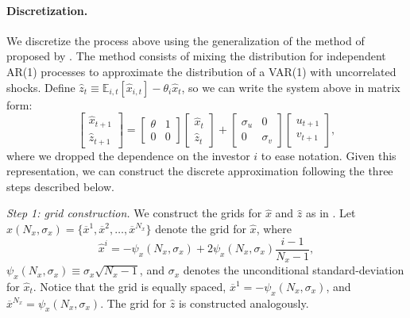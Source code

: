 \paragraph{Discretization.} We discretize the process above using the generalization of the method of \citet{rouwenhurst1995asset} proposed by \citet{gospodinov2014moment}. 
The method consists of mixing the distribution for independent AR(1) processes to approximate the distribution of a VAR(1) with uncorrelated shocks. 
Define $\hat{z}_{t} \equiv \mathbb{E}_{i,t}[\hat{x}_{i,t}] - \theta_i \hat{x}_t$, so we can write the system above in matrix form:
\begin{equation}
    \left[ \begin{matrix}
        \hat{x}_{t+1}\\
        \hat{z}_{t+1}
    \end{matrix}\right] = \left[ \begin{matrix}
        \theta & 1\\
        0 & 0
    \end{matrix}\right]
    \left[ \begin{matrix}
    \hat{x}_t\\
    \hat{z}_{t}
    \end{matrix}
    \right]+\left[ \begin{matrix}
        \sigma_u & 0\\
        0 & \sigma_v
    \end{matrix}\right]
    \left[ \begin{matrix}
     u_{t+1}\\
     v_{t+1}
    \end{matrix}
    \right],
\end{equation}
where we dropped the dependence on the investor $i$ to ease notation.
Given this representation, we can construct the discrete approximation following the three steps described below.


\textit{Step 1: grid construction.}
We construct the grids for $\hat{x}$ and $\hat{z}$ as in \citet{rouwenhurst1995asset}. 
Let $\hat{x}(N_x, \sigma_x) = \{ \overline{x}^1, \overline{x}^2, \ldots, \overline{x}^{N_x} \}$ denote the grid for $\hat{x}$, where 
\begin{equation}
    \hat{x}^i = - \psi_x(N_x, \sigma_x) + 2 \psi_x(N_x, \sigma_x) \frac{i-1}{N_x-1}, 
\end{equation}
$\psi_x(N_x, \sigma_x) \equiv \sigma_x \sqrt{N_x -1}$, and $\sigma_x$ denotes the unconditional standard-deviation for $\hat{x}_t$. Notice that the grid is equally spaced, $\overline{x}^1 = - \psi_x(N_x, \sigma_x)$, and $\overline{x}^{N_x} = \psi_x(N_x, \sigma_x)$. 
The grid for $\hat{z}$ is constructed analogously. 


